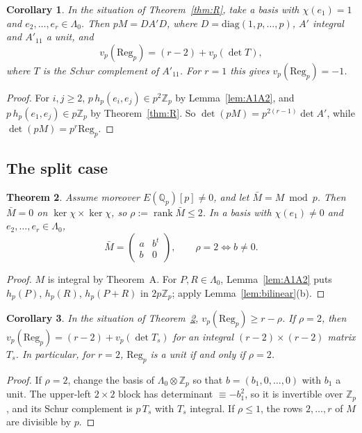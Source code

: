 \documentclass[11pt,a4paper]{amsart}
\newcommand{\Qp}{\mathbb{Q}_p}
\newcommand{\Zp}{\mathbb{Z}_p}
\newcommand{\Reg}{\mathrm{Reg}}
\newcommand{\Lam}{\Lambda}
\theoremstyle{plain}
\newtheorem{theorem}{Theorem}[section]
\newtheorem{corollary}[theorem]{Corollary}
\theoremstyle{definition}
\theoremstyle{remark}
\begin{document}
\begin{corollary}\label{cor:R-det}
In the situation of Theorem~\ref{thm:R}, take a basis with $\chi(e_1)=1$ and $e_2,\dots,e_r\in\Lam_0$. Then $pM=DA'D$, where $D=\mathrm{diag}(1,p,\dots,p)$, $A'$ integral and $A'_{11}$ a unit, and
\[
v_p(\Reg_p)=(r-2)+v_p(\det T),
\]
where $T$ is the Schur complement of $A'_{11}$. For $r=1$ this gives $v_p(\Reg_p)=-1$.
\end{corollary}

\begin{proof}
For $i,j\ge2$, $p\,h_p(e_i,e_j)\in p^2\Zp$ by Lemma~\ref{lem:A1A2}, and $p\,h_p(e_1,e_j)\in p\Zp$ by Theorem~\ref{thm:R}. So $\det(pM)=p^{2(r-1)}\det A'$, while $\det(pM)=p^r\Reg_p$.
\end{proof}

\subsection{The split case}

\begin{theorem}\label{thm:Rs}
Assume moreover $E(\Qp)[p]\ne0$, and let $\bar M=M\bmod p$. Then $\bar M=0$ on $\ker\chi\times\ker\chi$, so $\rho:=\operatorname{rank}\bar M\le2$. In a basis with $\chi(e_1)\ne0$ and $e_2,\dots,e_r\in\Lam_0$,
\[
\bar M=\begin{pmatrix}a&b^t\\ b&0\end{pmatrix},\qquad \rho=2\iff b\ne0 .
\]
\end{theorem}

\begin{proof}
$M$ is integral by Theorem~A. For $P,R\in\Lam_0$, Lemma~\ref{lem:A1A2} puts $h_p(P)$, $h_p(R)$, $h_p(P+R)$ in $2p\Zp$; apply Lemma~\ref{lem:bilinear}(b).
\end{proof}

\begin{corollary}\label{cor:Rs-det}
In the situation of Theorem~\ref{thm:Rs}, $v_p(\Reg_p)\ge r-\rho$. If $\rho=2$, then $v_p(\Reg_p)=(r-2)+v_p(\det T_s)$ for an integral $(r-2)\times(r-2)$ matrix $T_s$. In particular, for $r=2$, $\Reg_p$ is a unit if and only if $\rho=2$.
\end{corollary}

\begin{proof}
If $\rho=2$, change the basis of $\Lam_0\otimes\Zp$ so that $b=(b_1,0,\dots,0)$ with $b_1$ a unit. The upper-left $2\times2$ block has determinant $\equiv-b_1^2$, so it is invertible over $\Zp$, and its Schur complement is $p\,T_s$ with $T_s$ integral. If $\rho\le1$, the rows $2,\dots,r$ of $M$ are divisible by $p$.
\end{proof}
\end{document}
